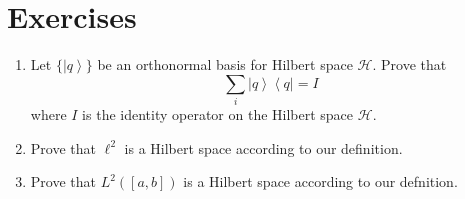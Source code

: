 \documentclass[book.tex]{subfiles}
\begin{document}
\section{Exercises}
\begin{enumerate}
    \item Let $\{\left | q\right \rangle \}$ be an orthonormal basis for Hilbert space $\mathcal{H}$. Prove that 
    \begin{equation}
        \sum_i \left | q \right \rangle \left \langle q \right | = I
    \end{equation}
    where $I$ is the identity operator on the Hilbert space $\mathcal{H}$.
    \label{operatoridentity}
    \item Prove that $\ell^2$ is a Hilbert space according to our definition.
    \item Prove that $L^2([a, b])$ is a Hilbert space according to our defnition.
\end{enumerate}
\end{document}
